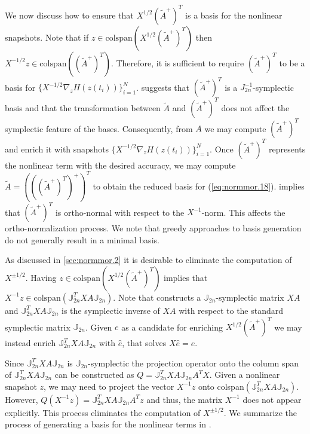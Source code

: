 We now discuss how to ensure that $X^{1/2} (\tilde A^+)^T$ is a basis for the nonlinear snapshots. Note that if $z \in \text{colspan}\left(X^{1/2} (\tilde A^+)^T\right)$ then $X^{-1/2} z \in \text{colspan}\left(( \tilde A^+)^T \right)$. Therefore, it is sufficient to require $(\tilde A^+)^T$ to be a basis for $\{X^{-1/2} \nabla_z H(z(t_i))\}_{i=1}^N$.  suggests that $(\tilde A^+)^T$ is a $J_{2n}^{-1}$-symplectic basis and that the transformation between $\tilde A$ and $(\tilde A^+)^T $ does not affect the symplectic feature of the bases. Consequently, from $A$ we may compute $(\tilde A^+)^T$ and enrich it with snapshots $\{X^{-1/2} \nabla_z H(z(t_i))\}_{i=1}^N$. Once $(\tilde A^+)^T$ represents the nonlinear term with the desired accuracy, we may compute $\tilde A= \left( \left( ( \tilde A^+ )^T \right)^+ \right)^T$ to obtain the reduced basis for (\ref{eq:normmor.18}).  implies that $(\tilde A^+)^T$ is ortho-normal with respect to the $X^{-1}$-norm. This affects the ortho-normalization process. We note that greedy approaches to basis generation do not generally result in a minimal basis.

As discussed in \cref{sec:normmor.2} it is desirable to eliminate the computation of $X^{\pm 1/2}$. Having $z \in \text{colspan}\left(X^{1/2} (\tilde A^+)^T\right)$ implies that $X^{-1} z \in \text{colspan}(\mathbb J_{2n}^T X A \mathbb J_{2n})$. Note that  constructs a $\mathbb J_{2n}$-symplectic matrix $XA$ and $\mathbb J_{2n}^T X A \mathbb J_{2n}$ is the symplectic inverse of $XA$ with respect to the standard symplectic matrix $\mathbb J_{2n}$. Given $e$ as a candidate for enriching $X^{1/2} (\tilde A^+)^T$ we may instead enrich $\mathbb J_{2n}^T X A \mathbb J_{2n}$ with $\hat e$, that solves $X \hat e = e$.

Since  $\mathbb J_{2n}^T X A \mathbb J_{2n}$ is $\mathbb J_{2n}$-symplectic the projection operator onto the column span of $\mathbb J_{2n}^T X A \mathbb J_{2n}$ can be constructed as $Q=\mathbb J_{2n}^T X A \mathbb J_{2n}A^TX$. Given a nonlinear snapshot $z$, we may need to project the vector $X^{-1}z$ onto colspan$(\mathbb J_{2n}^T X A \mathbb J_{2n})$. However, $Q(X^{-1}z)=\mathbb J_{2n}^T X A \mathbb J_{2n}A^Tz$ and thus, the matrix $X^{-1}$ does not appear explicitly. This process eliminates the computation of $X^{\pm 1/2}$. We summarize the process of generating a basis for the nonlinear terms in .

